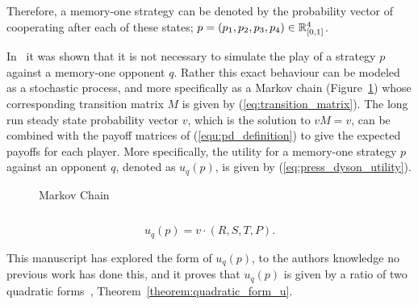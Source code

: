 Therefore, a memory-one strategy can be denoted by the probability vector of
cooperating after each of these states; \(p=(p_1, p_2, p_3, p_4) \in \mathbb{R}_{[0,1]}
^ 4\).

In~\cite{Nowak1989} it was shown that it is not necessary to simulate the play
of a strategy $p$ against a memory-one opponent $q$. Rather this exact behaviour
can be modeled as a stochastic process, and more specifically as a Markov chain
(Figure~\ref{fig:markov_chain}) whose corresponding transition matrix \(M\) is
given by (\ref{eq:transition_matrix}). The long run steady state probability
vector \(v\), which is the solution to \(v M = v\), can be
combined with the payoff matrices of (\ref{equ:pd_definition}) to give the expected
payoffs for each player. More specifically, the utility for a memory-one
strategy \(p\) against an opponent \(q\), denoted as \(u_q(p)\), is given by
(\ref{eq:press_dyson_utility}).

\begin{figure}
    \centering
    
    \caption{Markov Chain}
    \label{fig:markov_chain}
\end{figure}

\begin{equation}\label{eq:transition_matrix}
    
\end{equation}


\begin{equation}\label{eq:press_dyson_utility}
    u_q(p) = v \cdot (R, S, T, P).
\end{equation}

This manuscript has explored the form of \(u_q(p)\), to the authors knowledge no
previous work has done this, and it proves that \(u_q(p)\) is given by a ratio
of two quadratic forms~\cite{kepner2011},
Theorem~\ref{theorem:quadratic_form_u}.

